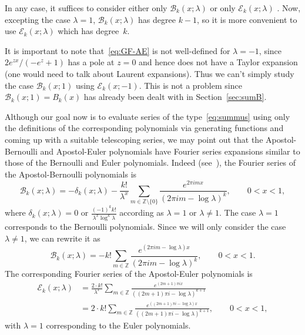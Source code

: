 \documentclass[11pt, oneside]{article}
\newcommand{\Z}{\mathbb{Z}}
\newcommand{\calB}{\mathcal{B}}
\newcommand{\calE}{\mathcal{E}}
\theoremstyle{plain}
\theoremstyle{definition}
\begin{document}
In any case, it suffices to consider either only $\calB_k(x;\lambda)$ or only $\calE_k(x;\lambda)$ .
Now, excepting the case $\lambda=1$, $\calB_k(x;\lambda)$ has degree $k-1$, so it is more convenient to use $\calE_{k}(x;\lambda)$ which has degree~$k$.

It is important to note that~\eqref{eq:GF-AE} is not well-defined for $\lambda=-1$, since
${2 e^{zx}}/(-e^z+1)$ has a pole at $z=0$ and hence does not have a Taylor expansion (one would need to talk about Laurent expansions). Thus we can't simply study the case $\calB_{k}(x;1)$ using $\calE_{k}(x;-1)$. This is not a problem since $\calB_{k}(x;1) = B_{k}(x)$ has already been dealt with in Section~\ref{sec:sumB}.

Although our goal now is to evaluate series of the type~\eqref{eq:summus} using only the definitions of the corresponding polynomials via generating functions and coming up with a suitable telescoping series,  we may point out that the Apostol-Bernoulli and Apostol-Euler polynomials have Fourier series expansions similar to those of the Bernoulli and Euler polynomials. Indeed (see~\cite{NRV}), the Fourier series of the Apostol-Bernoulli polynomials is
\begin{equation*}
  \calB_k(x;\lambda) = -\delta_k(x;\lambda) - \frac{k!}{\lambda^x} \sum_{m \in \Z \setminus\{0\}} 
  \frac{e^{2\pi i m x}}{(2\pi i m - \log \lambda)^k},
  \qquad 0 < x < 1,
\end{equation*}
where $\delta_k(x;\lambda) = 0$ or $\frac{(-1)^k k!}{\lambda^x \log^k \lambda}$ according as $\lambda = 1$ or $\lambda \ne 1$. The case $\lambda=1$ corresponds to the Bernoulli polynomials. Since we will only consider the case $\lambda\ne1$, we can rewrite it as
\begin{equation}
\label{eq:FS-AB}
  \calB_k(x;\lambda) = - k! \sum_{m \in \Z} 
  \frac{e^{(2\pi i m - \log\lambda) x}}{(2\pi i m - \log\lambda)^k},
  \qquad 0 < x < 1.
\end{equation}
The corresponding Fourier series of the Apostol-Euler polynomials is
\begin{equation}
\label{eq:FS-AE}
\begin{aligned}
    \calE_k(x;\lambda) 
  &= \frac{2 \cdot k!}{\lambda^x} \sum_{m \in \Z} 
    \frac{e^{(2m+1)\pi i x}}{((2m+1)\pi i - \log \lambda)^{k+1}} \\
  &= 2 \cdot k! \sum_{m \in \Z} 
    \frac{e^{((2m+1)\pi i - \log\lambda) x}}{((2m+1)\pi i - \log\lambda)^{k+1}},
  \qquad 0 < x < 1,
\end{aligned}
\end{equation}
with $\lambda = 1$ corresponding to the Euler polynomials.
\end{document}
